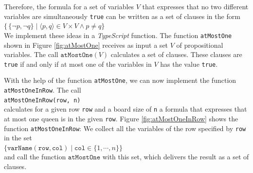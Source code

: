 \noindent
Therefore, the formula for a set of variables $V$ that expresses that no two different
variables are simultaneously \texttt{true} can be written as a set of clauses in the form
\\[0.2cm]
\hspace*{1.3cm}
$\bigl\{\, \{ \neg p, \neg q \} \;|\; \langle p, q \rangle \in V \times V \wedge p \neq q \bigr\}$
\\[0.2cm]
We implement these ideas in a \textsl{TypeScript} function. The function \texttt{atMostOne} shown in Figure
\ref{fig:atMostOne} receives as input a set $V$ of propositional variables. The call $\texttt{atMostOne}(V)$
calculates a set of clauses. These clauses are \texttt{true} if and only if at most one of the variables in $V$
has the value \texttt{true}.

With the help of the function \texttt{atMostOne}, we can now implement the function
\texttt{atMostOneInRow}. The call \\[0.2cm]
\hspace*{1.3cm} 
\texttt{atMostOneInRow(row, n)} \\[0.2cm]
calculates for a given row \texttt{row} and a board size of \texttt{n} a formula
that expresses that at most one queen is in the given \texttt{row}.
Figure \ref{fig:atMostOneInRow} shows the
function \texttt{atMostOneInRow}: We collect all the variables of the row specified by \texttt{row}
in the set 
\\[0.2cm]
\hspace*{1.3cm}
$\bigl\{ \texttt{varName}(\texttt{row}, \mathtt{col}) \mid \mathtt{col} \in \{1, \cdots, n \} \bigr\}$
\\[0.2cm]
and call the function $\texttt{atMostOne}$ with this set, which delivers the result
as a set of clauses.

